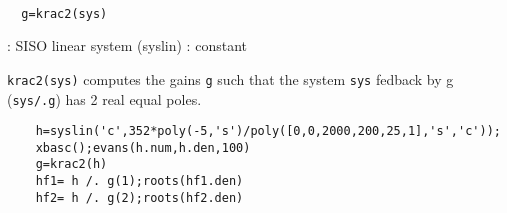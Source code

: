 \begin{mandesc}
   \\ %
\end{mandesc}
\begin{calling_sequence}
\begin{verbatim}
  g=krac2(sys)  
\end{verbatim}
\end{calling_sequence}
\begin{parameters}
  \begin{varlist}
    : SISO linear system (syslin)
    : constant
  \end{varlist}
\end{parameters}
\begin{mandescription}
  \verb!krac2(sys)! computes the gains \verb!g! such that the system
  \verb!sys! fedback by g (\verb!sys/.g!) has  2 real equal poles.
\end{mandescription}
\begin{examples}
  \begin{Verbatim}
    h=syslin('c',352*poly(-5,'s')/poly([0,0,2000,200,25,1],'s','c'));
    xbasc();evans(h.num,h.den,100)
    g=krac2(h)
    hf1= h /. g(1);roots(hf1.den)
    hf2= h /. g(2);roots(hf2.den)
  \end{Verbatim}
\end{examples}
\begin{manseealso}
     
\end{manseealso}
